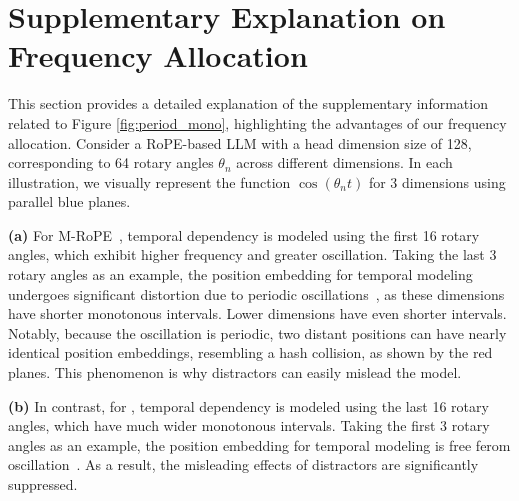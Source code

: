 

\section{Supplementary Explanation on Frequency Allocation} \label{app:supp_explain_modules}

This section provides a detailed explanation of the supplementary information related to Figure \ref{fig:period_mono}, highlighting the advantages of our frequency allocation. Consider a RoPE-based LLM with a head dimension size of 128, corresponding to 64 rotary angles $\theta_n$ across different dimensions. In each illustration, we visually represent the function $\cos(\theta_n t)$ for 3 dimensions using parallel blue planes. 

\textbf{(a)} For M-RoPE~\cite{wang2024qwen2}, temporal dependency is modeled using the first 16 rotary angles, which exhibit higher frequency and greater oscillation. Taking the last 3 rotary angles as an example, the position embedding for temporal modeling undergoes significant distortion due to periodic oscillations~\cite{men2024base}, as these dimensions have shorter monotonous intervals. Lower dimensions have even shorter intervals. Notably, because the oscillation is periodic, two distant positions can have nearly identical position embeddings, resembling a hash collision, as shown by the red planes. This phenomenon is why distractors can easily mislead the model.

\textbf{(b)} In contrast, for \methodname, temporal dependency is modeled using the last 16 rotary angles, which have much wider monotonous intervals. Taking the first 3 rotary angles as an example, the position embedding for temporal modeling is free ferom oscillation~\cite{men2024base}. As a result, the misleading effects of distractors are significantly suppressed.


